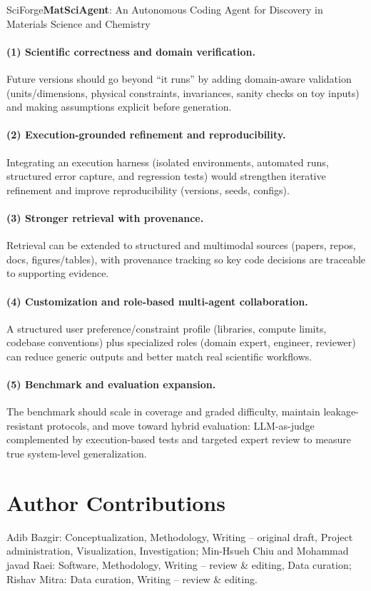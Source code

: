 \begin{teamsubmission}{SciForge}{\textbf{MatSciAgent}: An Autonomous Coding Agent for Discovery in Materials Science and Chemistry}
\paragraph{(1) Scientific correctness and domain verification.}
Future versions should go beyond ``it runs'' by adding domain-aware validation (units/dimensions, physical
constraints, invariances, sanity checks on toy inputs) and making assumptions explicit before generation.

\paragraph{(2) Execution-grounded refinement and reproducibility.}
Integrating an execution harness (isolated environments, automated runs, structured error capture, and
regression tests) would strengthen iterative refinement and improve reproducibility (versions, seeds, configs).

\paragraph{(3) Stronger retrieval with provenance.}
Retrieval can be extended to structured and multimodal sources (papers, repos, docs, figures/tables), with
provenance tracking so key code decisions are traceable to supporting evidence.

\paragraph{(4) Customization and role-based multi-agent collaboration.}
A structured user preference/constraint profile (libraries, compute limits, codebase conventions) plus
specialized roles (domain expert, engineer, reviewer) can reduce generic outputs and better match real
scientific workflows.

\paragraph{(5) Benchmark and evaluation expansion.}
The benchmark should scale in coverage and graded difficulty, maintain leakage-resistant protocols, and
move toward hybrid evaluation: LLM-as-judge complemented by execution-based tests and targeted expert
review to measure true system-level generalization.

\section*{Author Contributions}
Adib Bazgir: Conceptualization, Methodology, Writing – original draft, Project administration, Visualization, Investigation; Min-Hsueh Chiu and Mohammad javad Raei: Software, Methodology, Writing – review \& editing, Data curation; Rishav Mitra: Data curation, Writing – review \& editing.
\end{teamsubmission}



